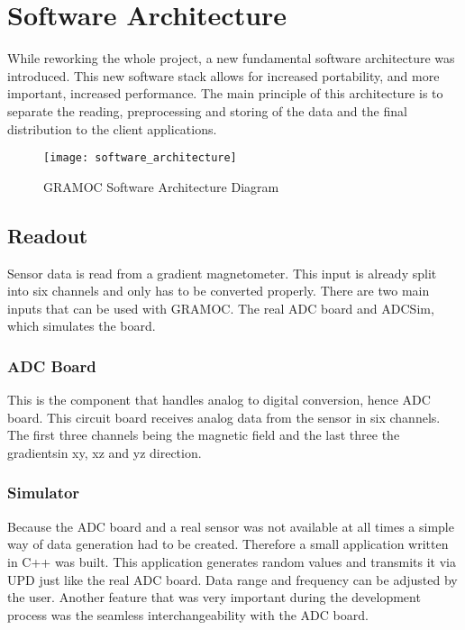 \chapter{Software Architecture}
\label{ch:Software_Architecture}

\author{Nico Kratky}
%
While reworking the whole project, a new fundamental software architecture was introduced. This new software stack allows for increased portability, and more important, increased performance. The main principle of this architecture is to separate the reading, preprocessing and storing of the data and the final distribution to the client applications.

\begin{figure}[H]
    \centering
    \texttt{[image: software\_architecture]}
    \caption{GRAMOC Software Architecture Diagram}
    \label{fig:software_architecture}
\end{figure}

\section{Readout}

Sensor data is read from a gradient magnetometer. This input is already split into six channels and only has to be converted properly. There are two main inputs that can be used with GRAMOC. The real ADC board and ADCSim, which simulates the board.

\subsection{ADC Board}

This is the component that handles analog to digital conversion, hence ADC board. This circuit board receives analog data from the sensor in six channels. The first three channels being the magnetic field and the last three the gradientsin xy, xz and yz direction.

\subsection{Simulator}

Because the ADC board and a real sensor was not available at all times a simple way of data generation had to be created. Therefore a small application written in C++ was built. This application generates random values and transmits it via UPD just like the real ADC board. Data range and frequency can be adjusted by the user. Another feature that was very important during the development process was the seamless interchangeability with the ADC board.
